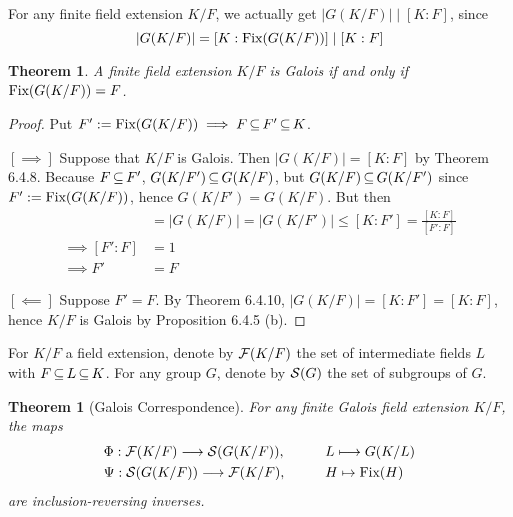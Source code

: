 \documentclass[11pt]{book}
\newcounter{counter}
\newtheorem{theorem}[counter]{Theorem}   \newtheorem*{theorem*}{Theorem}   \newtheorem{lemma}[counter]{Lemma}   \newtheorem{corollary}[counter]{Corollary}
\theoremstyle{definition}   \newtheorem{defn}[counter]{Definition} %
\newcommand{\vs}{\vspace{8pt}}   \newcommand{\hs}{\hspace{8pt}}
\numberwithin{counter}{chapter}
\begin{document}
\vs

\begin{remark*}
For any finite field extension $K/F$, we actually get $|G(K/F)| \mid [K : F]$, since
	\[|G(K/F)| = [K : \textnormal{Fix}(G(K/F))] \mid [K : F] \]
\end{remark*}

\vs

\begin{theorem}
A finite field extension $K/F$ is Galois if and only if $\textnormal{Fix}(G(K/F)) = F$. 
\end{theorem}

\begin{proof}
Put $F' := \textnormal{Fix}(G(K/F)) \implies F \operatorname{\subseteq} F' \operatorname{\subseteq} K$. 

$[\implies]$ Suppose that $K/F$ is Galois. Then $|G(K/F)| = [K : F]$ by Theorem 6.4.8. Because $F \operatorname{\subseteq} F'$, $G(K/F') \operatorname{\subseteq} G(K/F)$, but $G(K/F) \operatorname{\subseteq} G(K/F')$ since $F' := \textnormal{Fix}(G(K/F))$, hence $G(K/F') = G(K/F)$. But then
\begin{align*}
[K : F] &= |G(K/F)| = |G(K/F')| \leq [K : F'] = \frac{[K : F]}{[F' : F]} \\
\implies [F' : F] &= 1 \\
\implies F' &= F
\end{align*}

$[\impliedby]$ Suppose $F' = F$. By Theorem 6.4.10, $|G(K/F)| = [K : F'] = [K : F]$, hence $K/F$ is Galois by Proposition 6.4.5 (b). 
\end{proof}

\vs

\noindent {} For $K/F$ a field extension, denote by $\mathcal{F}(K/F)$ the set of intermediate fields $L$ with $F \operatorname{\subseteq} L \operatorname{\subseteq} K$. For any group $G$, denote by $\mathcal{S}(G)$ the set of subgroups of $G$. 

\vs

\begin{theorem}[Galois Correspondence]
For any finite Galois field extension $K/F$, the maps 
\begin{alignat*}{2}
&\Phi : \mathcal{F}(K/F) \longrightarrow \mathcal{S}(G(K/F)), \qquad && L \longmapsto G(K/L) \\
&\Psi : \mathcal{S}(G(K/F)) \longrightarrow \mathcal{F}(K/F), && H \mapsto \textnormal{Fix}(H)
\end{alignat*}
are inclusion-reversing inverses. 
\end{theorem}
\end{document}
